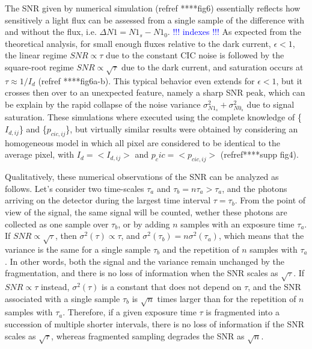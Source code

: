 \documentclass{article}
\begin{document}
The SNR given by numerical simulation (refref ****fig6) essentially reflects how sensitively a light flux can be assessed from a single sample of the difference with and without the flux, i.e. $\Delta N1 = N1_s - N1_0 $. \textcolor{blue}{!!! indexes  !!!}
As expected from the theoretical analysis, for small enough fluxes relative to the dark current, $\epsilon<1$, the linear regime $SNR \propto \tau$ due to the constant CIC noise is followed by the square-root regime $SNR \propto \sqrt{\tau}$ due to the dark current, and saturation occurs at $\tau\approx 1/I_{d}$ (refref ****fig6a-b).
This typical behavior even extends for $\epsilon<1$, but it crosses then over to an unexpected feature, namely a sharp SNR peak, which can be explain by the rapid collapse of the noise variance $ \sigma^2_{N1_s}+\sigma^2_{N0_s}$ due to signal saturation.
These simulations where executed using the complete knowledge of \{$I_{d,ij}$\} and \{${p_{cic,ij}}$\}, but virtually similar results were obtained by considering an homogeneous model in which all pixel are considered to be identical to the average pixel, with $I_d=<I_{d,ij}>$ and $p_cic=<p_{cic,ij}>$ (refref****supp fig4).

Qualitatively, these numerical observations of the SNR can be analyzed as follows.
Let's consider two time-scales $\tau_a$ and  $\tau_b = n \tau_a > \tau_a$, and the photons arriving on the detector during the largest time interval $\tau = \tau_b$. 
From the point of view of the signal, the same signal will be counted, wether these photons are collected as one sample over $\tau_b$, or by adding $n$ samples with an exposure time $\tau_a$.
If $SNR \propto \sqrt{\tau}$, then $\sigma^2(\tau) \propto \tau$, and $\sigma^2(\tau_b)= n \sigma^2(\tau_a)$, which means that the variance is the same for a single sample $\tau_b$ and the repetition of $n$ samples with $\tau_a$.
In other words, both the signal and the variance remain unchanged by the fragmentation, and there is no loss of information when the SNR scales as $\sqrt{\tau}$.
If $SNR \propto \tau$ instead, $\sigma^2(\tau)$ is a constant that does not depend on $\tau$, and the SNR associated with a single sample $\tau_b$ is $\sqrt{n}$ times larger than for the repetition of $n$ samples with $\tau_a$.
Therefore, if a given exposure time $\tau$ is fragmented into a succession of multiple shorter intervals, there is no loss of information if the SNR scales as $\sqrt{\tau}$, whereas fragmented sampling degrades the SNR as $\sqrt{n}$.
\end{document}
